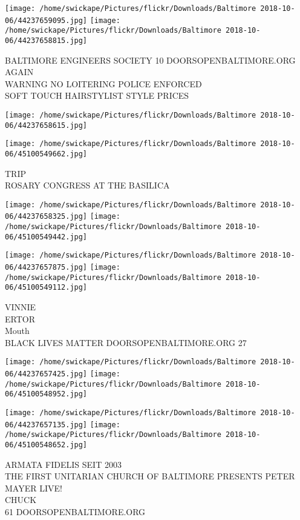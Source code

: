 \documentclass[10pt,letterpaper]{article}
\begin{document}
\texttt{[image: /home/swickape/Pictures/flickr/Downloads/Baltimore 2018-10-06/44237659095.jpg]}
\texttt{[image: /home/swickape/Pictures/flickr/Downloads/Baltimore 2018-10-06/44237658815.jpg]}

BALTIMORE ENGINEERS SOCIETY 10 DOORSOPENBALTIMORE.ORG\\
AGAIN\\
WARNING NO LOITERING POLICE ENFORCED\\
SOFT TOUCH HAIRSTYLIST STYLE PRICES\\
\pagebreak

\texttt{[image: /home/swickape/Pictures/flickr/Downloads/Baltimore 2018-10-06/44237658615.jpg]}

\vspace{0.25in}
\texttt{[image: /home/swickape/Pictures/flickr/Downloads/Baltimore 2018-10-06/45100549662.jpg]}

TRIP\\
ROSARY CONGRESS AT THE BASILICA\\
\pagebreak

\texttt{[image: /home/swickape/Pictures/flickr/Downloads/Baltimore 2018-10-06/44237658325.jpg]}
\texttt{[image: /home/swickape/Pictures/flickr/Downloads/Baltimore 2018-10-06/45100549442.jpg]}

\texttt{[image: /home/swickape/Pictures/flickr/Downloads/Baltimore 2018-10-06/44237657875.jpg]}
\texttt{[image: /home/swickape/Pictures/flickr/Downloads/Baltimore 2018-10-06/45100549112.jpg]}

VINNIE\\
ERTOR\\
Mouth\\
BLACK LIVES MATTER DOORSOPENBALTIMORE.ORG 27\\
\pagebreak

\texttt{[image: /home/swickape/Pictures/flickr/Downloads/Baltimore 2018-10-06/44237657425.jpg]}
\texttt{[image: /home/swickape/Pictures/flickr/Downloads/Baltimore 2018-10-06/45100548952.jpg]}

\texttt{[image: /home/swickape/Pictures/flickr/Downloads/Baltimore 2018-10-06/44237657135.jpg]}
\texttt{[image: /home/swickape/Pictures/flickr/Downloads/Baltimore 2018-10-06/45100548652.jpg]}

ARMATA FIDELIS SEIT 2003\\
THE FIRST UNITARIAN CHURCH OF BALTIMORE PRESENTS PETER MAYER LIVE!\\
CHUCK\\
61 DOORSOPENBALTIMORE.ORG\\
\pagebreak
\end{document}
